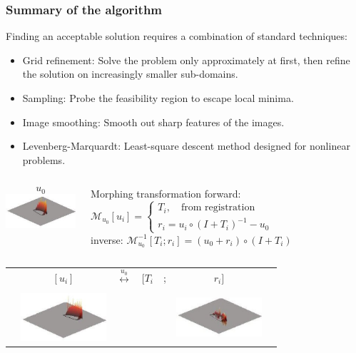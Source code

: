 \documentclass{beamer}
\begin{document}
{\small
\begin{frame}
\frametitle{Summary of the algorithm}
Finding an acceptable solution requires a combination of standard techniques:
\begin{itemize}
\item \alert{Grid refinement}: Solve the problem only approximately at first, then refine
the solution on increasingly smaller sub-domains.
\item \alert{Sampling}:  Probe the feasibility region to escape local minima.
\item \alert{Image smoothing}: Smooth out sharp features of the images.
\item \alert{Levenberg-Marquardt}: Least-square descent method designed for nonlinear problems.
\end{itemize}
\end{frame}}

\begin{frame}
\begin{center}
\begin{columns}[c]
\[u_0\]
\includegraphics[width=1.25in]{eps/mtrans_u0}
\begin{block}{Morphing transformation}{\small
forward: $\mathcal{M}_{u_0}[u_i]=\left\{\begin{array}{l}
T_i,\quad\mbox{from registration}\\
r_i=u_i\circ(I+T_i)^{-1}-u_0
\end{array}\right.$\\
\vspace{.1in}
inverse: $\mathcal{M}_{u_0}^{-1}[T_i;r_i]=(u_0+r_i)\circ(I+T_i)$}
\end{block}
\end{columns}
\end{center}
\hspace{-.3in}\begin{tabular}{ccccccc}
&$[u_i]$&$\overset{u_0}{\longleftrightarrow}$&$[T_i$&;&$r_i]$&\\
\\
&\includegraphics[width=1.25in]{eps/mtrans_u}&&
&&\includegraphics[width=1.25in]{eps/mtrans_r}&
\end{tabular}
\end{frame}
\end{document}
